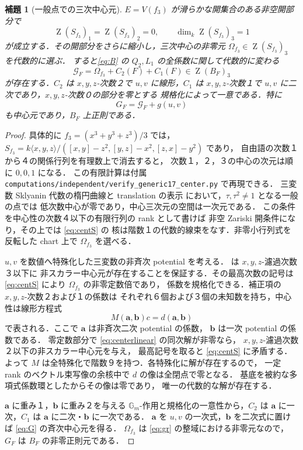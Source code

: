 \documentclass[11pt,a4paper]{ltjsarticle}
\numberwithin{equation}{section}
\newtheorem{lemma}[theorem]{補題}
\newcommand{\Z}{\operatorname{Z}}
\begin{document}
\begin{lemma}[一般点での三次中心元]\label{lem:center}
$E=V(f_3)$ が滑らかな開集合のある非空開部分で
\begin{equation}\label{eq:centS}
 \Z(S_{f_3})_1=\Z(S_{f_3})_2=0,\qquad
 \dim_k\Z(S_{f_3})_3=1
\end{equation}
が成立する．その開部分をさらに縮小し，三次中心の非零元
$\Omega_{f_3}\in\Z(S_{f_3})_3$ を代数的に選ぶ．
すると\eqref{eq:B} の $Q_2,L_1$ の全係数に関して代数的に変わる
\begin{equation}\label{eq:G}
 \mathcal G_F=\Omega_{f_3}+C_2(F)+C_1(F)\in\Z(B_F)_3
\end{equation}
が存在する．$C_2$ は $x,y,z$-次数２で $u,v$ に線形，$C_1$ は
$x,y,z$-次数１で $u,v$ に二次であり，$x,y,z$-次数０の部分を零とする
規格化によって一意である．特に
\begin{equation}\label{eq:Gg}
 G_F=\mathcal G_F+g(u,v)
\end{equation}
も中心元であり，$B_F$ 上正則である．
\end{lemma}
\begin{proof}
具体的に $f_3=(x^3+y^3+z^3)/3$ では，
$S_{f_3}=k\langle x,y,z\rangle/([x,y]-z^2,[y,z]-x^2,[z,x]-y^2)$ であり，
自由語の次数１から４の関係行列を有理数上で消去すると，
次数１，２，３の中心の次元は順に $0,0,1$ になる．
この有限計算は付属 \nolinkurl{computations/independent/verify_generic17_center.py} で再現できる．
三変数 Sklyanin 代数の楕円曲線と translation の表示
\cite{ATV,EG} において，$\tau,\tau^2\ne1$ となる一般の点では
低次数中心が零であり，中心三次元の空間は一次元である．
この条件を中心性の次数４以下の有限行列の rank として書けば
非空 Zariski 開条件になり，その上では \eqref{eq:centS} の
核は階数１の代数的線束をなす．非零小行列式を反転した
chart 上で $\Omega_{f_3}$ を選べる．

$u,v$ を数値へ特殊化した三変数の非斉次 potential を考える．
\cite[Theorem~3.3.2(ii)]{EG} は $x,y,z$-濾過次数３以下に
非スカラー中心元が存在することを保証する．その最高次数の記号は
\eqref{eq:centS} により $\Omega_{f_3}$ の非零定数倍であり，
係数を規格化できる．補正項の $x,y,z$-次数２および１の係数は
それぞれ６個および３個の未知数を持ち，中心性は線形方程式
\begin{equation}\label{eq:centerlinear}
 M(\mathbf a,\mathbf b)c=d(\mathbf a,\mathbf b)
\end{equation}
で表される．ここで $\mathbf a$ は非斉次二次 potential の係数，
$\mathbf b$ は一次 potential の係数である．
零定数部分で \eqref{eq:centerlinear} の同次解が非零なら，
$x,y,z$-濾過次数２以下の非スカラー中心元を与え，
最高記号を取ると \eqref{eq:centS} に矛盾する．
よって $M$ は全特殊化で階数９を持つ．各特殊化に解が存在するので，
一定 rank のベクトル束写像の余核中で $d$ の像は全閉点で零となる．
基底を被約な多項式係数環としたからその像は零であり，
唯一の代数的な解が存在する．

$\mathbf a$ に重み１，$\mathbf b$ に重み２を与える
$\mathbb G_m$-作用と規格化の一意性から，$C_2$ は
$\mathbf a$ に一次，$C_1$ は $\mathbf a$ に二次・$\mathbf b$ に一次である．
$\mathbf a$ を $u,v$ の一次式，$\mathbf b$ を二次式に置けば
\eqref{eq:G} の斉次中心元を得る．
$\Omega_{f_3}$ は \eqref{eq:gr} の整域における非零元なので，
$G_F$ は $B_F$ の非零正則元である．
\end{proof}
\end{document}
